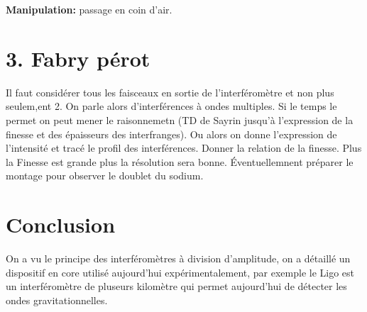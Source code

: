 \documentclass[french, a4paper, 10pt, twocolumn, landscape]{article}
\begin{document}
\textbf{Manipulation:} passage en coin d'air.

\section*{3. Fabry pérot}

Il faut considérer tous les faisceaux en sortie de l'interféromètre et non plus seulem,ent 2. On parle alors d'interférences à ondes multiples. Si le temps le permet on peut mener le raisonnemetn (TD de Sayrin jusqu'à l'expression de la finesse et des épaisseurs des interfranges).  Ou alors on donne l'expression de l'intensité et tracé le profil des interférences. Donner la relation de la finesse. Plus la Finesse est grande plus la résolution sera bonne. Éventuellemnent préparer le montage pour observer le doublet du sodium.

\section*{Conclusion}

On a vu le principe des interféromètres à division d'amplitude, on a détaillé un dispositif en core utilisé aujourd'hui expérimentalement, par exemple le Ligo est un interféromètre de pluseurs kilomètre qui permet aujourd'hui de détecter les ondes gravitationnelles.
\end{document}
